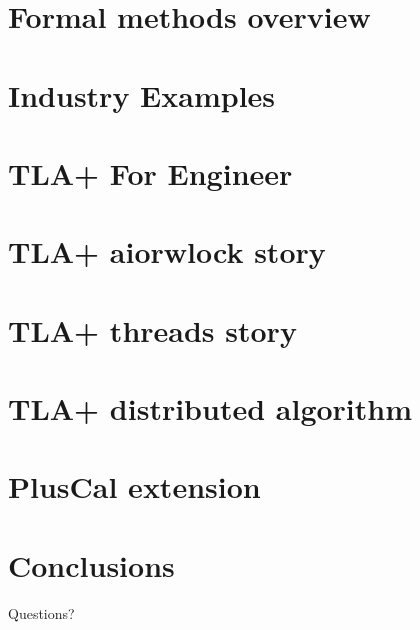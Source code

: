 \documentclass[12pt]{beamer}
\begin{document}
  \section{Formal methods overview}
  \section{Industry Examples}
  \section{TLA+ For Engineer}
  \section{TLA+ aiorwlock story}
  \section{TLA+ threads story}
  \section{TLA+ distributed algorithm}
  \section{PlusCal extension}
  \section{Conclusions}
\appendix
\begin{frame}[standout]
  Questions?
\end{frame}
\end{document}
